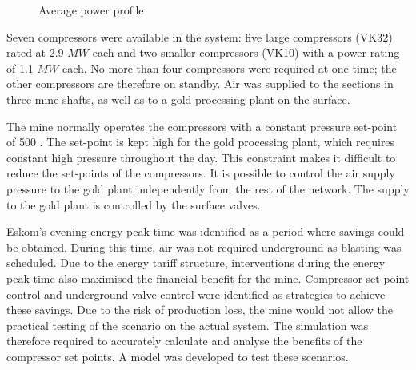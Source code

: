 \clearpage
\begin{figure}[h!]
	\centering
	
	\caption{Average power profile}
	\label{fig: Beatrix power baseline}
\end{figure}
 Seven compressors were available in the system: five large compressors (VK32) rated at 2.9 $MW$ each and two smaller compressors (VK10) with a power rating of 1.1 $MW$ each. No more than four compressors were required at one time; the other compressors are therefore on standby. Air was supplied to the sections in three mine shafts, as well as to a gold-processing plant on the surface. 
 \par 
 The mine normally operates the compressors with a constant pressure  set-point of 500 . The  set-point is kept high for the gold processing plant, which requires constant high pressure throughout the day. This constraint makes it difficult to reduce the  set-points of the compressors. It is possible to control the air supply pressure to the gold plant independently from the rest of the network. The supply to the gold plant is controlled by the surface valves.
 \par 
 Eskom's evening energy peak time was identified as a period where savings could be obtained. During this time, air was not required underground as blasting was scheduled. Due to the energy tariff structure, interventions during the energy peak time also maximised the financial benefit for the mine. Compressor  set-point control and underground valve control were identified as strategies to achieve these savings. Due to the risk of production loss, the mine would not allow the practical testing of the scenario on the actual system. The simulation was therefore required to accurately calculate and analyse the benefits of the compressor set points. A model was developed to test these scenarios.

